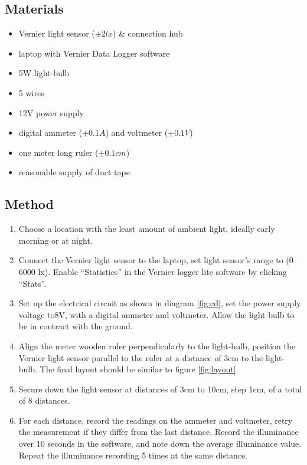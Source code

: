 \documentclass[a4paper,12pt]{article}
\begin{document}
\subsection{Materials}
\begin{itemize}
 \item Vernier light sensor ($\pm 2\si{lx}$) \parencite{vernier_manual} \& connection hub
 \item laptop with Vernier Data Logger software
 \item 5W light-bulb
 \item 5 wires
 \item 12V power supply
 \item digital ammeter ($\pm 0.1\si{A}$) and voltmeter ($\pm 0.1\si{V}$)
 \item one meter long ruler ($\pm 0.1\si{cm}$)
 \item reasonable supply of duct tape
 \end{itemize}

\subsection{Method}

\begin{enumerate}
 \item Choose a location with the least amount of ambient light, ideally early morning or at night.

 \item Connect the Vernier light sensor to the laptop, set light sensor's range to (0–6000 \si{lx}). Enable ``Statistics'' in the Vernier logger lite software by clicking ``Stats''.

 \item Set up the electrical circuit as shown in diagram \ref{fig:cd}, set the power supply voltage to8V, with a digital ammeter and voltmeter. Allow the light-bulb to be in contract with the ground.

 \item Align the meter wooden ruler perpendicularly to the light-bulb, position the Vernier light sensor parallel to the ruler at a distance of 3cm to the light-bulb. The final layout should be similar to figure \ref{fig:layout}.

 \item Secure down the light sensor at distances of 3cm to 10cm, step 1cm, of a total of 8 distances.

 \item For each distance, record the readings on the ammeter and voltmeter, retry the measurement if they differ from the last distance. Record the illuminance over 10 seconds in the software, and note down the average illuminance value. Repeat the illuminance recording 5 times at the same distance.
\end{enumerate}
\end{document}
